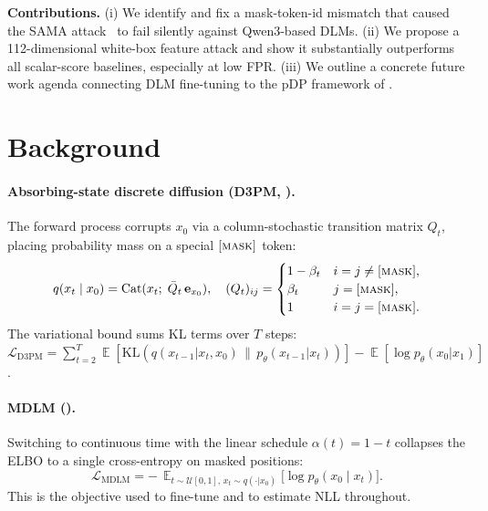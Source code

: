 \documentclass{article}
\DeclareMathOperator*{\E}{\mathbb{E}}
\newcommand{\KL}{\mathrm{KL}}
\newcommand{\MASK}{[\textsc{mask}]}
\begin{document}
\textbf{Contributions.}
(i) We identify and fix a mask-token-id mismatch that caused the SAMA
attack~\citep{shi2025sama} to fail silently against Qwen3-based DLMs.
(ii) We propose a 112-dimensional white-box feature attack and show it
substantially outperforms all scalar-score baselines, especially at low FPR.
(iii) We outline a concrete future work agenda connecting DLM fine-tuning to
the pDP framework of \citet{wei2023pdp}.

\section{Background}
\label{sec:background}

\paragraph{Absorbing-state discrete diffusion (D3PM, \citealt{austin2021d3pm}).}
The forward process corrupts $x_0$ via a column-stochastic transition matrix
$Q_t$, placing probability mass on a special $\MASK$ token:
\begin{equation}
  q(x_t \mid x_0) = \mathrm{Cat}(x_t;\; \bar{Q}_t\,\mathbf{e}_{x_0}),
  \quad (Q_t)_{ij} =
  \begin{cases} 1-\beta_t & i=j\ne\MASK,\\
                \beta_t   & j=\MASK,\\ 1 & i=j=\MASK.
  \end{cases}
  \label{eq:d3pm}
\end{equation}
The variational bound sums KL terms over $T$ steps:
$\mathcal{L}_{\mathrm{D3PM}} = \sum_{t=2}^{T}
  \E[\KL(q(x_{t-1}|x_t,x_0)\,\|\,p_\theta(x_{t-1}|x_t))]
  - \E[\log p_\theta(x_0|x_1)]$.

\paragraph{MDLM (\citealt{sahoo2024mdlm}).}
Switching to continuous time with the linear schedule $\alpha(t)=1-t$
collapses the ELBO to a single cross-entropy on masked positions:
\begin{equation}
  \mathcal{L}_{\mathrm{MDLM}}
  = -\,\E_{t\sim\mathcal{U}[0,1],\,x_t\sim q(\cdot|x_0)}
    \!\bigl[\log p_\theta(x_0\mid x_t)\bigr].
  \label{eq:mdlm}
\end{equation}
This is the objective used to fine-tune and to estimate NLL throughout.
\end{document}
